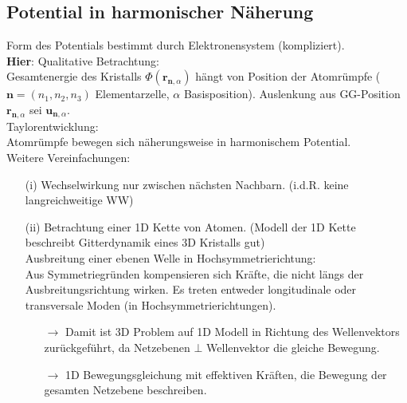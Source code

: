 \subsection{Potential in harmonischer Näherung}		\label{kap:4_1} 
Form des Potentials bestimmt durch Elektronensystem (kompliziert). \\
\textbf{Hier}: Qualitative Betrachtung: \\
Gesamtenergie des Kristalls $\Phi\left( \textbf{r}_{\textbf{n},\alpha} \right)$ hängt von Position 
der Atomrümpfe ($\textbf{n} = (n_1,n_2,n_3)$ Elementarzelle, $\alpha$ Basisposition). Auslenkung aus GG-Position 
$\textbf{r}_{\textbf{n},\alpha}$ sei $\textbf{u}_{\textbf{n},\alpha}$. \\
Taylorentwicklung: \\


Atomrümpfe bewegen sich näherungsweise in harmonischem Potential.\\
Weitere Vereinfachungen:
\begin{itemize}
	\item[(i)] Wechselwirkung nur zwischen nächsten Nachbarn.
	(i.d.R. keine langreichweitige WW)
	\item[(ii)] Betrachtung einer 1D Kette von Atomen. (Modell der 1D Kette beschreibt Gitterdynamik eines 3D Kristalls gut)\\
	Ausbreitung einer ebenen Welle in Hochsymmetrierichtung:\\
	Aus Symmetriegründen kompensieren sich Kräfte, die nicht längs der Ausbreitungsrichtung wirken. Es treten entweder longitudinale oder transversale Moden (in Hochsymmetrierichtungen).\\
	\begin{itemize}
		\item[$\rightarrow$] Damit ist 3D Problem auf 1D Modell in Richtung des Wellenvektors zurückgeführt, da Netzebenen $\bot$  Wellenvektor die gleiche Bewegung.
		\item[$\rightarrow$] 1D Bewegungsgleichung mit effektiven Kräften, die Bewegung der gesamten Netzebene beschreiben.
	\end{itemize}
\end{itemize}



